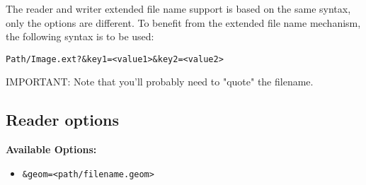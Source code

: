 The reader and writer extended file name support is based on the same syntax,
only the options are different.  To benefit from the extended file name
mechanism, the following syntax is to be used:

\begin{verbatim}
Path/Image.ext?&key1=<value1>&key2=<value2>
\end{verbatim}

IMPORTANT: Note that you'll probably need to "quote" the filename.

\subsection{Reader options}

\textbf{Available Options:}

\begin{itemize}

\item \begin{verbatim}&geom=<path/filename.geom>\end{verbatim}


\end{itemize}
